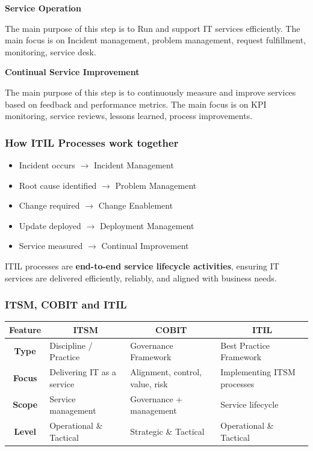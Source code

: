 \noindent\textbf{Service Operation}

The main purpose of this step is to Run and support IT services efficiently. The main focus is on Incident management, problem management, request fulfillment, monitoring, service desk.

\noindent\textbf{Continual Service Improvement}

The main purpose of this step is to continuously measure and improve services based on feedback and performance metrics. The main focus is on KPI monitoring, service reviews, lessons learned, process improvements.

\subsubsection{How ITIL Processes work together}

\begin{itemize}
    \item Incident occurs $\xrightarrow{}$ Incident Management
    \item Root cause identified $\xrightarrow{}$ Problem Management
    \item Change required $\xrightarrow{}$ Change Enablement
    \item Update deployed $\xrightarrow{}$ Deployment Management
    \item Service measured $\xrightarrow{}$ Continual Improvement
\end{itemize}

ITIL processes are \textbf{end-to-end service lifecycle activities}, ensuring IT services are delivered efficiently, reliably, and aligned with business needs.

\subsubsection{ITSM, COBIT and ITIL}

\begin{table}[h]
\centering
\begin{tabular}{|c|l|l|l|}
\hline
\textbf{Feature} & \multicolumn{1}{c|}{\textbf{ITSM}} & \multicolumn{1}{c|}{\textbf{COBIT}} & \multicolumn{1}{c|}{\textbf{ITIL}} \\ \hline
\textbf{Type}    & Discipline / Practice              & Governance Framework                & Best Practice Framework            \\ \hline
\textbf{Focus}   & Delivering IT as a service         & Alignment, control, value, risk     & Implementing ITSM processes        \\ \hline
\textbf{Scope}   & Service management                 & Governance + management             & Service lifecycle                  \\ \hline
\textbf{Level}   & Operational \& Tactical            & Strategic \& Tactical               & Operational \& Tactical            \\ \hline
\end{tabular}
\end{table}




